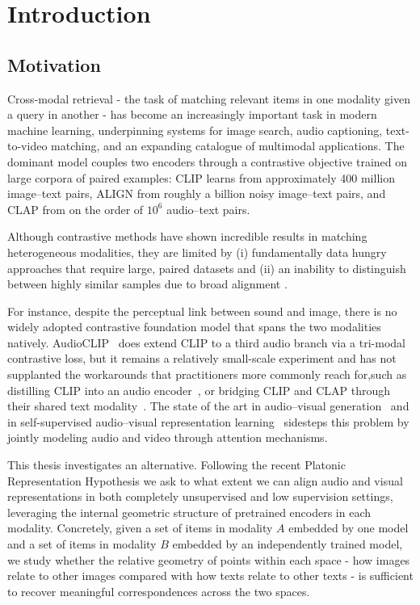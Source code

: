 \chapter{Introduction}

\section{Motivation}

Cross-modal retrieval - the task of matching relevant items in one modality given a query in another - has become an increasingly important task in modern machine learning, underpinning systems for image search, audio captioning, text-to-video matching, and an expanding catalogue of multimodal applications. The dominant model couples two encoders through a contrastive objective trained on large corpora of paired examples: CLIP \cite{radford2021clip} learns from approximately 400 million image--text pairs, ALIGN \cite{jia2021align} from roughly a billion noisy image--text pairs, and CLAP \cite{elizalde2023clap} from on the order of $10^6$ audio--text pairs. 

Although contrastive methods have shown incredible results in matching heterogeneous modalities, they are limited by (i) fundamentally data hungry approaches that require large, paired datasets \cite{Yuan2021Multimodal} and (ii) an inability to distinguish between highly similar samples due to broad alignment \cite{rösch2024enhancingconceptualunderstandingmultimodal}.

For instance, despite the perceptual link between sound and image, there is no widely adopted contrastive foundation model that spans the two modalities natively. AudioCLIP~\cite{guzhov2021audioclip} does extend CLIP to a third audio branch via a tri-modal contrastive loss, but it remains a relatively small-scale experiment and has not supplanted the workarounds that practitioners more commonly reach for,such as distilling CLIP into an audio encoder~\cite{wu2021wav2clip}, or bridging CLIP and CLAP through their shared text modality~\cite{wang2023cmcr,wang2023exmcr}. 
The state of the art in audio--visual generation~\cite{cheng2025mmaudio} and in self-supervised audio--visual representation learning~\cite{alwassel2019xdc,morgado2021avid} sidesteps this problem by jointly modeling audio and video through attention mechanisms.

This thesis investigates an alternative. Following the recent Platonic Representation Hypothesis \cite{huh2024platonic} we ask to what extent we can align audio and visual representations in both completely unsupervised and low supervision settings, leveraging the internal geometric structure of pretrained encoders in each modality. Concretely, given a set of items in modality $A$ embedded by one model and a set of items in modality $B$ embedded by an independently trained model, we study whether the relative geometry of points within each space - how images relate to other images compared with how texts relate to other texts - is sufficient to recover meaningful correspondences across the two spaces.

